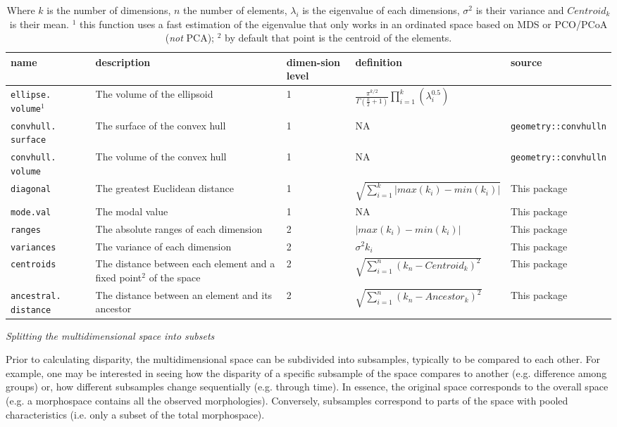 \documentclass[12pt,letterpaper]{article}
\renewcommand{\subsection}[1]{%
\bigskip
\begin{center}
\begin{large}
\normalfont\itshape #1
\end{large}
\end{center}}
\begin{document}
\begin{table}
\resizebox{\textwidth}{!}
{%
    \begin{tabular}{p{2cm}|p{5cm}|p{1cm}|p{5cm}|p{5cm}}
        name & description & dimen-sion level & definition & source \\
        \hline
        \texttt{ellipse. volume}$^1$ & The volume of the ellipsoid & 1 & $\frac{\pi^{k/2}}{\Gamma(\frac{k}{2}+1)}\displaystyle\prod_{i=1}^{k} (\lambda_{i}^{0.5})$ & \cite{DonohueDim}\\
        \texttt{convhull. surface} & The surface of the convex hull & 1 & NA & \texttt{geometry::convhulln} \\
        \texttt{convhull. volume} & The volume of the convex hull & 1 & NA & \texttt{geometry::convhulln} \\
        \texttt{diagonal} & The greatest Euclidean distance & 1 & $\sqrt{\sum_{i=1}^{k}|max(k_i) - min(k_i)|}$ & This package \\
        \texttt{mode.val} & The modal value & 1 & NA & This package\\
        \texttt{ranges} & The absolute ranges of each dimension & 2 & $|max(k_i) - min(k_i)|$ & This package \\
        \texttt{variances} & The variance of each dimension & 2 & $\sigma^{2}{k_i}$ & This package \\
        \texttt{centroids} & The distance between each element and a fixed point$^2$ of the space & 2 & $\sqrt{\sum_{i=1}^{n}{({k}_{n}-Centroid_{k})^2}}$ & This package \\
        \texttt{ancestral. distance} & The distance between an element and its ancestor & 2 & $\sqrt{\sum_{i=1}^{n}{({k}_{n}-Ancestor_{k})^2}}$ & This package \\
    \end{tabular}
}%
    \caption{\small{Where $k$ is the number of dimensions, $n$ the number of elements, $\lambda_i$ is the eigenvalue of each dimensions, $\sigma^{2}$ is their variance and $Centroid_{k}$ is their mean. $^1$ this function uses a fast estimation of the eigenvalue that only works in an ordinated space based on MDS or PCO/PCoA (\textit{not} PCA); $^2$ by default that point is the centroid of the elements.}}
    \label{Tab:metrics}
\end{table}


\subsection{Splitting the multidimensional space into subsets}
Prior to calculating disparity, the multidimensional space can be subdivided into subsamples, typically to be compared to each other.
For example, one may be interested in seeing how the disparity of a specific subsample of the space compares to another (e.g. difference among groups) or, how different subsamples change sequentially (e.g. through time).
In essence, the original space corresponds to the overall space (e.g. a morphospace contains all the observed morphologies).
Conversely, subsamples correspond to parts of the space with pooled characteristics (i.e. only a subset of the total morphospace).
\end{document}
